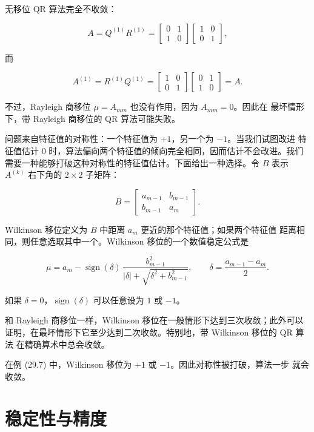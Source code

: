 \documentclass[UTF8,fontset=none,12pt]{ctexart}
\begin{document}
无移位 QR 算法完全不收敛：

$$
A=Q^{(1)}R^{(1)}
 =\begin{bmatrix}0&1\\1&0\end{bmatrix}
  \begin{bmatrix}1&0\\0&1\end{bmatrix},
$$

而

$$
A^{(1)}=R^{(1)}Q^{(1)}
 =\begin{bmatrix}1&0\\0&1\end{bmatrix}
  \begin{bmatrix}0&1\\1&0\end{bmatrix}=A.
$$

不过，Rayleigh 商移位 $\mu=A_{mm}$ 也没有作用，因为 $A_{mm}=0$。因此在
最坏情形下，带 Rayleigh 商移位的 QR 算法可能失败。

问题来自特征值的对称性：一个特征值为 $+1$，另一个为 $-1$。当我们试图改进
特征值估计 0 时，算法偏向两个特征值的倾向完全相同，因而估计不会改进。我们
需要一种能够打破这种对称性的特征值估计。下面给出一种选择。令 $B$ 表示
$A^{(k)}$ 右下角的 $2\times2$ 子矩阵：

$$
B=\begin{bmatrix}
a_{m-1}&b_{m-1}\\
b_{m-1}&a_m
\end{bmatrix}.
$$

Wilkinson 移位定义为 $B$ 中距离 $a_m$ 更近的那个特征值；如果两个特征值
距离相同，则任意选取其中一个。Wilkinson 移位的一个数值稳定公式是

\begin{equation}
\mu=a_m-\operatorname{sign}(\delta)\,
\frac{b_{m-1}^2}{|\delta|+\sqrt{\delta^2+b_{m-1}^2}},
\qquad
\delta=\frac{a_{m-1}-a_m}{2}.
\tag{29.8}
\end{equation}

如果 $\delta=0$，$\operatorname{sign}(\delta)$ 可以任意设为 $1$ 或 $-1$。

和 Rayleigh 商移位一样，Wilkinson 移位在一般情形下达到三次收敛；此外可以
证明，在最坏情形下它至少达到二次收敛。特别地，带 Wilkinson 移位的 QR 算法
在精确算术中总会收敛。

在例 (29.7) 中，Wilkinson 移位为 $+1$ 或 $-1$。因此对称性被打破，算法一步
就会收敛。

\section*{稳定性与精度}
\end{document}
